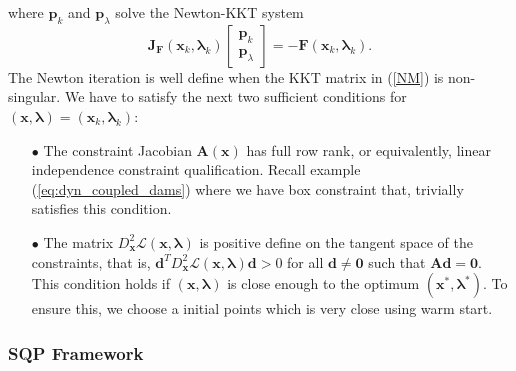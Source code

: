 where $\bm{p}_k$ and $\bm{p}_{\lambda}$ solve the Newton-KKT system
\begin{equation}
\bm{J}_{\bm{F}}(\bm{x}_k,\bm{\lambda}_k)\begin{bmatrix}
\bm{p}_{k}\\
\bm{p}_{\lambda}
\end{bmatrix}=-\bm{F}(\bm{x}_k,\bm{\lambda}_k).
\label{NM}
\end{equation}
The Newton iteration is well define when the KKT matrix in (\ref{NM}) is non-singular. We have to satisfy the next two sufficient conditions for $(\bm{x},\bm{\lambda})=(\bm{x}_k,\bm{\lambda}_k)$:
\begin{enumerate}

\item[$\bullet$] The constraint Jacobian $\bm{A}(\bm{x})$ has full row rank, or equivalently, linear independence constraint qualification. Recall example (\ref{eq:dyn_coupled_dams}) where we have box constraint that, trivially satisfies this condition.

\item[$\bullet$] The matrix $D^2_{\bm{x}}\mathcal{L}(\bm{x},\bm{\lambda})$ is positive define on the tangent space of the constraints, that is, $\bm{d}^T D^2_{\bm{x}}\mathcal{L}(\bm{x},\bm{\lambda})\bm{d}>0$ for all $\bm{d}\neq\bm{0}$ such that $\bm{A}\bm{d}=\bm{0}$.\\
This condition holds if $(\bm{x},\bm{\lambda})$ is close enough to the optimum $(\bm{x}^*,\bm{\lambda}^*)$. To ensure this, we choose a initial points which is very close using warm start.

\end{enumerate}

\subsubsection{SQP Framework}

